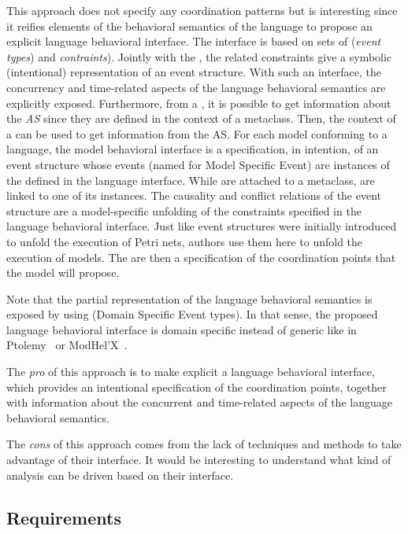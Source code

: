 This approach does not specify any coordination patterns but is interesting since it reifies elements of the behavioral semantics of the language to propose an explicit language behavioral interface. The interface is based on sets of \dse (\emph{event types}) and \emph{contraints}). Jointly with the \dse, the related constraints give a symbolic (intentional) representation of an event structure. With such an interface, the concurrency and time-related aspects of the language behavioral semantics are explicitly exposed.
%
Furthermore, from a \dse, it is possible to get information about the \emph{AS} since they are defined in the context of a metaclass. Then, the context of a \dse can be used to get information from the AS.   
For each model conforming to a language, the model behavioral interface is a specification, in intention, of an event structure whose events (named \mse for Model Specific Event) are instances of the \dse defined in the language interface. While \dse are attached to a metaclass, \mse are linked to one of its instances. The causality and conflict relations of the event structure are a model-specific unfolding of the constraints specified in the language behavioral interface. Just like event structures were initially introduced to unfold the execution of Petri nets, authors use them here to unfold the execution of models. The \dse are then a specification of the coordination points that the model will propose.

Note that the partial representation of the language behavioral semantics is exposed by using \dse (Domain Specific Event types). In that sense, the proposed language behavioral interface is domain specific instead of generic like in Ptolemy~\cite{ptoleframebib} or ModHel'X~\cite{modhelxbib}. 

The \emph{pro} of this approach is to make explicit a language behavioral interface, which provides an intentional specification of the coordination points, together with information about the concurrent and time-related aspects of the language behavioral semantics.

The \emph{cons} of this approach comes from the lack of techniques and methods to take advantage of their interface. It would be interesting to understand what kind of analysis can be driven based on their interface.



\subsection{Requirements}

